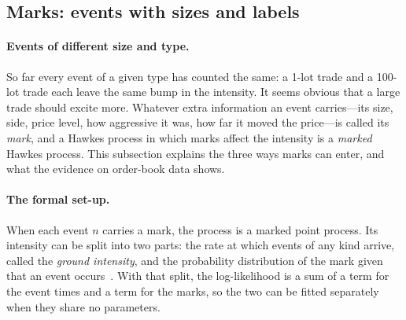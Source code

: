 \subsection{Marks: events with sizes and labels}
\label{sec:hawkes-marks}

\paragraph{Events of different size and type.} So far every event of a given type has counted the same: a 1-lot trade and a 100-lot
trade each leave the same bump in the intensity. It seems obvious that a large trade should excite more. Whatever
extra information an event carries---its size, side, price level, how aggressive it was, how far it moved the
price---is called its \emph{mark}, and a Hawkes process in which marks affect the intensity is a \emph{marked}
Hawkes process. This subsection explains the three ways marks can enter, and what the evidence on order-book data
shows.

\paragraph{The formal set-up.} When each event $n$ carries a mark, the process is a marked point process. Its
intensity can be split into two parts: the rate at which events of any kind arrive, called the \emph{ground
intensity}, and the probability distribution of the mark given that an event occurs~\citep{rasmussen2018notes}.
With that split, the log-likelihood is a sum of a term for the event times and a term for the marks, so the two
can be fitted separately when they share no parameters.

